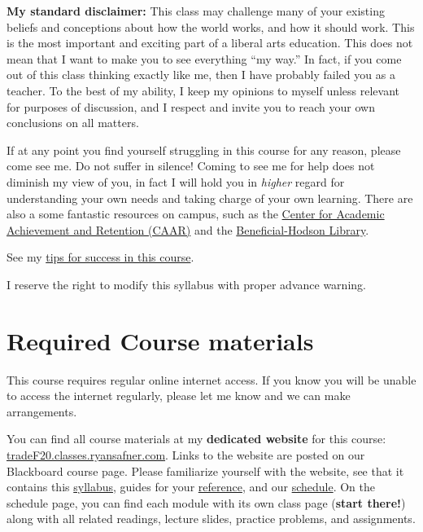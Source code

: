 \documentclass{article}
\begin{document}
\textbf{My standard disclaimer:} This class may challenge many of your
existing beliefs and conceptions about how the world works, and how it
should work. This is the most important and exciting part of a liberal
arts education. This does not mean that I want to make you to see
everything ``my way.'' In fact, if you come out of this class thinking
exactly like me, then I have probably failed you as a teacher. To the
best of my ability, I keep my opinions to myself unless relevant for
purposes of discussion, and I respect and invite you to reach your own
conclusions on all matters.

If at any point you find yourself struggling in this course for any
reason, please come see me. Do not suffer in silence! Coming to see me
for help does not diminish my view of you, in fact I will hold you in
\emph{higher} regard for understanding your own needs and taking charge
of your own learning. There are also a some fantastic resources on
campus, such as the
\href{http://www.hood.edu/campus-services/academic-services/index.html}{Center
for Academic Achievement and Retention (CAAR)} and the
\href{http://www.hood.edu/library/}{Beneficial-Hodson Library}.

See my
\href{http://tradeF20.classes.ryansafner.com/reference\#tips}{tips for
success in this course}.

I reserve the right to modify this syllabus with proper advance warning.

\hypertarget{required-course-materials}{%
\section*{Required Course materials}\label{required-course-materials}}

This course requires regular online internet access. If you know you
will be unable to access the internet regularly, please let me know and
we can make arrangements.

You can find all course materials at my \textbf{dedicated website} for
this course:
\href{https://tradeF20.classes.ryansafner.com}{tradeF20.classes.ryansafner.com}.
Links to the website are posted on our Blackboard course page. Please
familiarize yourself with the website, see that it contains this
\href{https://tradeF20.classes.ryansafner.com/syllabus/}{syllabus},
guides for your
\href{https://tradeF20.classes.ryansafner.com/reference/}{reference},
and our
\href{https://tradeF20.classes.ryansafner.com/schedule/}{schedule}. On
the schedule page, you can find each module with its own class page
(\textbf{start there!}) along with all related readings, lecture slides,
practice problems, and assignments.
\end{document}
